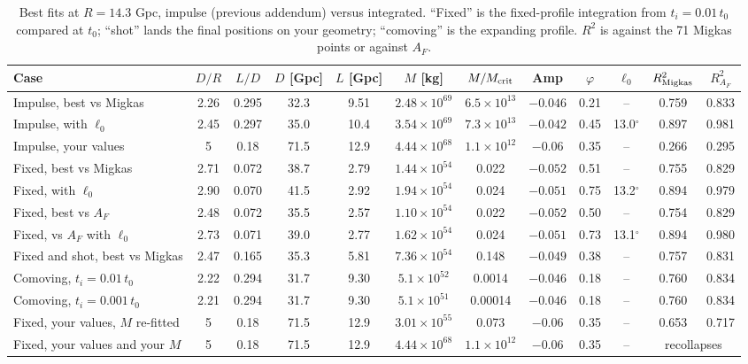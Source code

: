 \documentclass[10pt,letterpaper]{article}
\begin{document}
\begin{table}[H]\centering\footnotesize\setlength{\tabcolsep}{3.2pt}
\caption{Best fits at $R=14.3$ Gpc, impulse (previous addendum) versus integrated. ``Fixed'' is the fixed-profile integration from $t_i=0.01\,t_0$ compared at $t_0$; ``shot'' lands the final positions on your geometry; ``comoving'' is the expanding profile. $R^2$ is against the 71 Migkas points or against $A_F$.}\label{tab:fit}
\begin{tabular}{lccccccccccc}\toprule
Case & $D/R$ & $L/D$ & $D$ [Gpc] & $L$ [Gpc] & $M$ [kg] & $M/M_{\rm crit}$ & Amp & $\varphi$ & $\ell_0$ & $R^2_{\rm Migkas}$ & $R^2_{A_F}$\\\midrule
Impulse, best vs Migkas & 2.26 & 0.295 & 32.3 & 9.51 & $2.48\times10^{69}$ & $6.5\times10^{13}$ & $-0.046$ & 0.21 & -- & 0.759 & 0.833\\
Impulse, with $\ell_0$ & 2.45 & 0.297 & 35.0 & 10.4 & $3.54\times10^{69}$ & $7.3\times10^{13}$ & $-0.042$ & 0.45 & 13.0$^\circ$ & 0.897 & 0.981\\
Impulse, your values & 5 & 0.18 & 71.5 & 12.9 & $4.44\times10^{68}$ & $1.1\times10^{12}$ & $-0.06$ & 0.35 & -- & 0.266 & 0.295\\\midrule
Fixed, best vs Migkas & 2.71 & 0.072 & 38.7 & 2.79 & $1.44\times10^{54}$ & 0.022 & $-0.052$ & 0.51 & -- & 0.755 & 0.829\\
Fixed, with $\ell_0$ & 2.90 & 0.070 & 41.5 & 2.92 & $1.94\times10^{54}$ & 0.024 & $-0.051$ & 0.75 & 13.2$^\circ$ & 0.894 & 0.979\\
Fixed, best vs $A_F$ & 2.48 & 0.072 & 35.5 & 2.57 & $1.10\times10^{54}$ & 0.022 & $-0.052$ & 0.50 & -- & 0.754 & 0.829\\
Fixed, vs $A_F$ with $\ell_0$ & 2.73 & 0.071 & 39.0 & 2.77 & $1.62\times10^{54}$ & 0.024 & $-0.051$ & 0.73 & 13.1$^\circ$ & 0.894 & 0.980\\
Fixed and shot, best vs Migkas & 2.47 & 0.165 & 35.3 & 5.81 & $7.36\times10^{54}$ & 0.148 & $-0.049$ & 0.38 & -- & 0.757 & 0.831\\
Comoving, $t_i=0.01\,t_0$ & 2.22 & 0.294 & 31.7 & 9.30 & $5.1\times10^{52}$ & 0.0014 & $-0.046$ & 0.18 & -- & 0.760 & 0.834\\
Comoving, $t_i=0.001\,t_0$ & 2.21 & 0.294 & 31.7 & 9.30 & $5.1\times10^{51}$ & 0.00014 & $-0.046$ & 0.18 & -- & 0.760 & 0.834\\
Fixed, your values, $M$ re-fitted & 5 & 0.18 & 71.5 & 12.9 & $3.01\times10^{55}$ & 0.073 & $-0.06$ & 0.35 & -- & 0.653 & 0.717\\
Fixed, your values and your $M$ & 5 & 0.18 & 71.5 & 12.9 & $4.44\times10^{68}$ & $1.1\times10^{12}$ & $-0.06$ & 0.35 & -- & \multicolumn{2}{c}{recollapses}\\\bottomrule
\end{tabular}\end{table}
\end{document}
